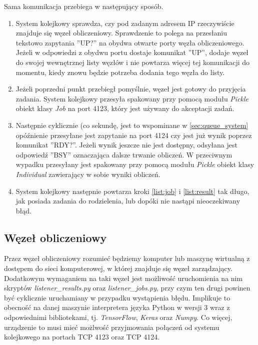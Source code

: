 Sama komunikacja przebiega w następujący sposób.
\begin{enumerate}
  \item System kolejkowy sprawdza, czy pod zadanym adresem IP rzeczywiście znajduje się węzeł obliczeniowy.
  Sprawdzenie to polega na przesłaniu tekstowo zapytania ''UP?'' na obydwa otwarte porty węzła obliczeniowego.
  Jeżeli w odpowiedzi z obydwu portu dostaje komunikat ''UP'', dodaje węzeł do swojej wewnętrznej listy węzłów i nie powtarza więcej tej komunikacji do momentu, kiedy znowu będzie potrzeba dodania tego węzła do listy.
  \item Jeżeli poprzedni punkt przebiegł pomyślnie, węzeł jest gotowy do przyjęcia zadania.
  System kolejkowy przesyła spakowany przy pomocą modułu \textit{Pickle} obiekt klasy \textit{Job} na port 4123, który jest używany do akceptacji zadań.\label{list:job}
  \item Następnie cyklicznie (co sekundę, jest to wspominane w \ref{sec:queue_system} opóźnienie przesyłane jest zapytanie na port 4124 czy jest już wynik poprzez komunikat ''RDY?''.
  Jeżeli wynik jeszcze nie jest dostępny, odsyłana jest odpowiedź ''BSY'' oznaczająca dalsze trwanie obliczeń.\label{list:result}
  W przeciwnym wypadku przesyłany jest spakowany przy pomocą modułu \textit{Pickle} obiekt klasy \textit{Individual} zawierający w sobie wyniki obliczeń.
  \item System kolejkowy następnie powtarza kroki \ref{list:job} i \ref{list:result} tak długo, jak posiada zadania do rodzielenia, lub dopóki nie nastąpi nieoczekiwany błąd.
\end{enumerate}

\subsection{Węzeł obliczeniowy}\label{sec:worker_node}

Przez węzeł obliczeniowy rozumieć będziemy komputer lub maszynę wirtualną z dostępem do sieci komputerowej, w której znajduje się węzeł zarządzający.
Dodatkowym wymaganiem na taki węzeł jest możliwość uruchomienia na nim skryptów \textit{listener\_results.py} oraz \textit{listener\_jobs.py}, przy czym ten drugi powinen być cyklicznie uruchamiany w przypadku wystąpienia błędu.
Implikuje to obecność na danej maszynie interpretera języka Python w wersji 3 wraz z odpowiednimi bibliotekami, tj. \textit{TensorFlow}\cite{tensorflow2015-whitepaper}, \textit{Keras}\cite{chollet2015keras} oraz \textit{Numpy}\cite{ascher.dubois.hinsen.hugunin.oliphant-1999-np}.
Co więcej, urządzenie to musi mieć możlwość przyjmowania połączeń od systemu kolejkowego na portach TCP 4123 oraz TCP 4124.

